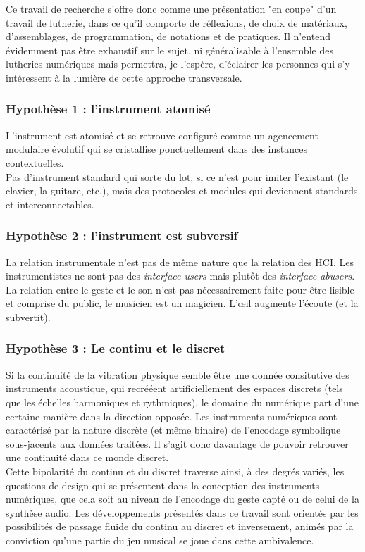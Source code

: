 Ce travail de recherche s'offre donc comme une présentation "en coupe" d'un travail de lutherie, dans ce qu'il comporte de réflexions, de choix de matériaux, d'assemblages, de programmation, de notations et de pratiques. Il n'entend évidemment pas être exhaustif sur le sujet, ni généralisable à l'ensemble des lutheries numériques mais permettra, je l'espère, d'éclairer les personnes qui s'y intéressent à la lumière de cette approche transversale.

\subsubsection*{Hypothèse 1 : l'instrument atomisé}
L'instrument est atomisé et se retrouve configuré comme un agencement modulaire évolutif qui se cristallise ponctuellement dans des instances contextuelles. \\
Pas d'instrument standard qui sorte du lot, si ce n'est pour imiter l'existant (le clavier, la guitare, etc.), mais des protocoles et modules qui deviennent standards et interconnectables.

\subsubsection*{Hypothèse 2 : l'instrument est subversif}

La relation instrumentale n'est pas de même nature que la relation des HCI.
Les instrumentistes ne sont pas des \textit{interface users} mais plutôt des \textit{interface abusers}.
La relation entre le geste et le son n'est pas nécessairement faite pour être lisible et comprise du public, le musicien est un magicien.
L'œil augmente l'écoute (et la subvertit).


\subsubsection*{Hypothèse 3 : Le continu et le discret}
Si la continuité de la vibration physique semble être une donnée consitutive des instruments acoustique, qui recrééent artificiellement des espaces discrets (tels que les échelles harmoniques et rythmiques), le domaine du numérique part d'une certaine manière dans la direction opposée. Les instruments numériques sont caractérisé par la nature discrète (et même binaire) de l'encodage symbolique sous-jacents aux données traitées. Il s'agit donc davantage de pouvoir retrouver une continuité dans ce monde discret.\\
Cette bipolarité du continu et du discret traverse ainsi, à des degrés variés, les questions de design qui se présentent dans la conception des instruments numériques, que cela soit au niveau de l'encodage du geste capté ou de celui de la synthèse audio. Les développements présentés dans ce travail sont orientés par les possibilités de passage fluide du continu au discret et inversement, animés par la conviction qu'une partie du jeu musical se joue dans cette ambivalence.


